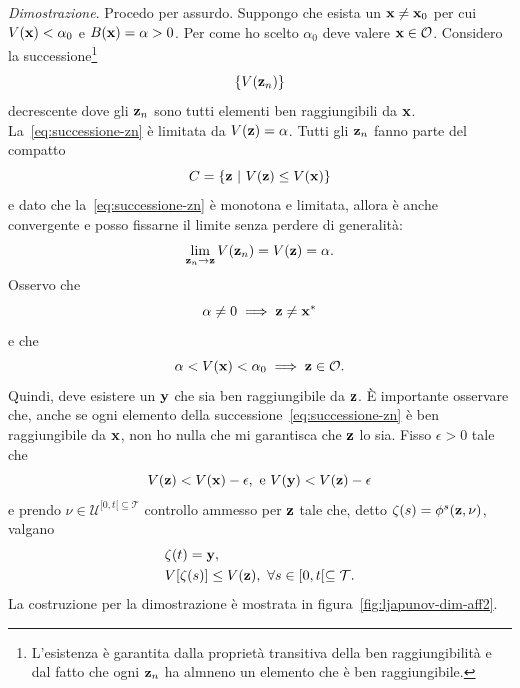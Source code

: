 \begin{steps}
    \emph{Dimostrazione}.
    Procedo per assurdo.
    Suppongo che esista un $\mathbf{x} \neq \mathbf{x}_0$ per cui $V(\mathbf{x}) < \alpha_0$
    e $B(\mathbf{x}) = \alpha > 0$.
    Per come ho scelto $\alpha_0$ deve valere $\mathbf{x} \in \mathcal O$.
    Considero la successione\footnote{L'esistenza
    è garantita dalla proprietà transitiva della ben raggiungibilità e dal fatto che
    ogni $\mathbf{z}_n$ ha almneno un elemento che è ben raggiungibile.}
    \begin{equation}
        \{V(\mathbf{z}_n)\}
        \label{eq:successione-zn}
    \end{equation}
    decrescente dove gli $\mathbf{z}_n$ sono tutti elementi ben raggiungibili da $\mathbf{x}$.
    La~\eqref{eq:successione-zn} è limitata da $V(\mathbf{z}) = \alpha$.
    Tutti gli $\mathbf{z}_n$ fanno parte del compatto
    \begin{equation*}
        C = \left\{\mathbf{z} \ |\ V(\mathbf{z}) \leq V(\mathbf{x}) \right\}
    \end{equation*}
    e dato che la~\eqref{eq:successione-zn} è monotona e limitata,
    allora è anche convergente e posso fissarne il limite senza perdere
    di generalità:
    \begin{equation}
        \lim_{\mathbf{z}_n \to \mathbf{z}} V(\mathbf{z}_n) = V(\mathbf{z}) = \alpha.
        \label{eq:vzequalsalpha}
    \end{equation}
    Osservo che
    \begin{equation*}
        \alpha \neq 0 \implies \mathbf{z} \neq \mathbf{x}^*
    \end{equation*}
    e che
    \begin{equation*}
        \alpha < V(\mathbf{x}) < \alpha_0 \implies \mathbf{z} \in \mathcal O.
    \end{equation*}
    Quindi, deve esistere un $\mathbf{y}$ che sia ben raggiungibile da $\mathbf{z}$.
    È importante osservare che, anche se ogni elemento della successione~\eqref{eq:successione-zn}
    è ben raggiungibile da $\mathbf{x}$, non ho nulla che mi garantisca che $\mathbf{z}$ lo sia.
    Fisso $\epsilon > 0$ tale che
    \begin{equation}
        V(\b z) < V(\b x) - \epsilon,\ \text{e} \ V(\b y) < V(\b z) - \epsilon
        \label{eq:vy-less-vz}
    \end{equation}
    e prendo $\nu \in \mathcal U^{[0, t[ \subseteq \mathcal T}$ controllo ammesso
    per $\mathbf{z}$ tale che, detto $\zeta(s) = \phi^s(\mathbf{z}, \nu)$, valgano
    \begin{align*}
        &\zeta(t) = \mathbf{y}, \\
        &V[\zeta(s)] \leq V(\mathbf{z}), \ \forall s \in [0, t[ \subseteq \mathcal T.
    \end{align*}
    La costruzione per la dimostrazione è mostrata in figura~\ref{fig:ljapunov-dim-aff2}.


\end{steps}
